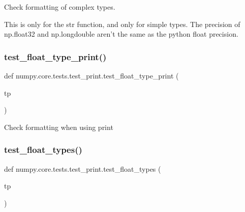\begin{DoxyVerb}Check formatting of complex types.

    This is only for the str function, and only for simple types.
    The precision of np.float32 and np.longdouble aren't the same as the
    python float precision.\end{DoxyVerb}
 \mbox{\label{namespacenumpy_1_1core_1_1tests_1_1test__print_a65ebe1218dec4df7365f23e83794baf5}} 
\subsubsection{\texorpdfstring{test\+\_\+float\+\_\+type\+\_\+print()}{test\_float\_type\_print()}}
{\footnotesize\ttfamily def numpy.\+core.\+tests.\+test\+\_\+print.\+test\+\_\+float\+\_\+type\+\_\+print (\begin{DoxyParamCaption}\item[{}]{tp }\end{DoxyParamCaption})}

\begin{DoxyVerb}Check formatting when using print \end{DoxyVerb}
 \mbox{\label{namespacenumpy_1_1core_1_1tests_1_1test__print_a7aed6e1b1afacba7e397501aa8bcc7cf}} 
\subsubsection{\texorpdfstring{test\+\_\+float\+\_\+types()}{test\_float\_types()}}
{\footnotesize\ttfamily def numpy.\+core.\+tests.\+test\+\_\+print.\+test\+\_\+float\+\_\+types (\begin{DoxyParamCaption}\item[{}]{tp }\end{DoxyParamCaption})}


